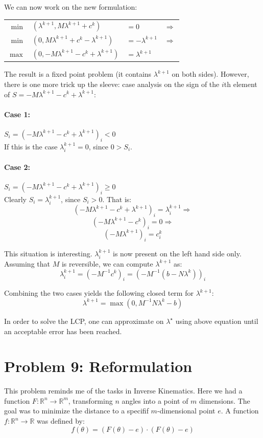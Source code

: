 \documentclass[10pt,oneside,a4paper,final,english]{memoir}
\begin{document}
We can now work on the new formulation:
\begin{center}\begin{tabular}{rlll}
    $ \min $ & $(\lambda^{k+1}, M\lambda^{k+1} + c^k)$&
    $ = 0 $ & $\Rightarrow $ \\

    $ \min $ & $(0, M\lambda^{k+1} + c^k - \lambda^{k+1}) $&
    $= -\lambda^{k+1} $ & $\Rightarrow $ \\

    $ \max $ & $(0, - M\lambda^{k+1} - c^k + \lambda^{k+1}) $&
    $= \lambda^{k+1} $ &
\end{tabular}\end{center}

The result is a fixed point problem (it contains $\lambda^{k+1}$ on
both sides). However, there is one more trick up the sleeve: case
analysis on the sign of the $i$th element of $S = -M\lambda^{k+1} - c^k +
\lambda^{k+1}$:

\paragraph{Case 1: } $S_i = (-M\lambda^{k+1}-c^k+\lambda^{k+1})_i < 0$\\
If this is the case $\lambda^{k+1}_i = 0$, since $0 > S_i$.

\paragraph{Case 2:} $S_i = (-M\lambda^{k+1}-c^k+\lambda^{k+1})_i \geq 0$\\
Clearly $S_i = \lambda^{k+1}_i$, since $S_i > 0$. That is:
\[ (-M\lambda^{k+1}-c^k+\lambda^{k+1})_i = \lambda^{k+1}_i \Rightarrow \]
\[ (-M\lambda^{k+1}-c^k)_i = 0 \Rightarrow \]
\[ (-M\lambda^{k+1})_i = c^k_i \]

This situation is interesting. $\lambda^{k+1}_i$ is now present on the
left hand side only. Assuming that $M$ is reversible, we can compute
$\lambda^{k+1}$ as:
\[ \lambda^{k+1}_i = (-M^{-1}c^k)_i = (-M^{-1}(b - N\lambda^k))_i \]

Combining the two cases yields the following closed term for
$\lambda^{k+1}$:
\[ \lambda^{k+1} = \max(0, M^{-1}N\lambda^k - b) \]

In order to solve the LCP, one can approximate on $\lambda^\star$
using above equation until an acceptable error has been reached.


\section{Problem 9: Reformulation}
This problem reminds me of the tasks in Inverse Kinematics. Here we
had a function $F : \mathbb{R}^n \to \mathbb{R}^m$, transforming
$n$ angles into a point of $m$ dimensions. The goal was to minimize
the distance to a specifif $m$-dimensional point $e$. A function $f :
\mathbb{R}^n \to \mathbb{R}$ was defined by:
\[ f(\theta) = (F(\theta) - e) \cdot (F(\theta) - e) \]
\end{document}
